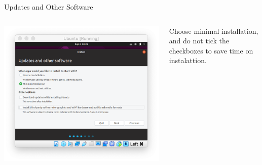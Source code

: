 \documentclass[12pt]{beamer}
\begin{document}
\begin{frame}{Updates and Other Software}
  \begin{columns}
    \begin{column}{0.65\linewidth}
      \includegraphics[width=\linewidth]{ubuntu-update}
    \end{column}
    \begin{column}{0.35\linewidth}
      Choose minimal installation, and do not tick the checkboxes to save time on instalattion.
    \end{column}
  \end{columns}
\end{frame}
\end{document}
